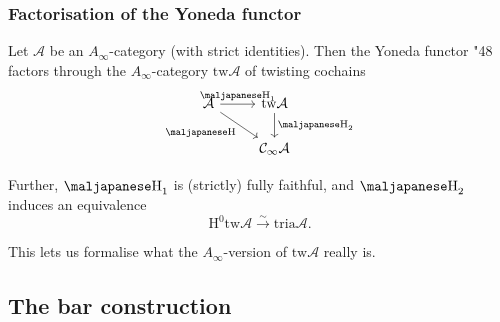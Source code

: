 \documentclass{beamer}
\begin{document}
        \begin{frame}[fragile]\frametitle{Factorisation of the Yoneda functor}
            \begin{theorem}
                Let $\mathcal{A}$ be an $A_\infty$-category (with strict identities).
                Then the Yoneda functor {\maljapanese\char"48} factors through the $A_\infty$-category $\mathrm{tw}\mathcal{A}$ of twisting cochains
                \begin{equation*}
                    \begin{tikzcd}
                        \mathcal{A}
                            \ar[r,"\text{{\maljapanese\char"48}}_1"]
                            \ar[dr,swap,"\text{{\maljapanese\char"48}}"]
                        & \mathrm{tw}\mathcal{A}
                            \ar[d,"\text{{\maljapanese\char"48}}_2"]\\
                        & \mathcal{C}_\infty\mathcal{A}
                    \end{tikzcd}
                \end{equation*}

                \pause
                
                Further, $\text{{\maljapanese\char"48}}_1$ is (strictly) fully faithful, and $\text{{\maljapanese\char"48}}_2$ induces an equivalence
                \begin{equation*}
                    \mathrm{H}^0\mathrm{tw}\mathcal{A} \xrightarrow{\sim} \mathrm{tria}\mathcal{A}.
                \end{equation*}

                \pause

                This lets us formalise what the $A_\infty$-version of $\mathrm{tw}\mathcal{A}$ really is.
            \end{theorem}
        \end{frame}
    
    \subsection{The bar construction}
\end{document}
